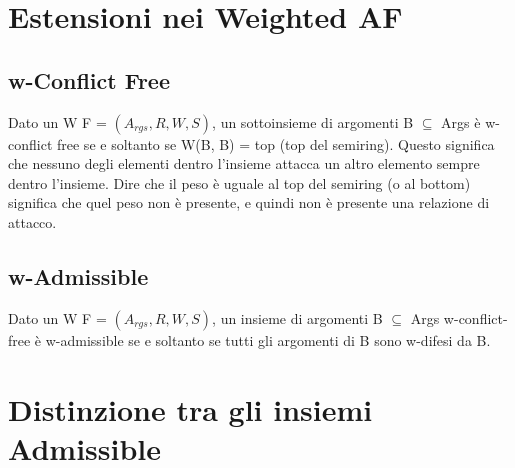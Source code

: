     \section{Estensioni nei Weighted AF}
    \subsection{w-Conflict Free}
    Dato un W F = $(A_{rgs} , R, W, S)$, un sottoinsieme di argomenti B
$\subseteq$ Args è w-conflict free se e soltanto se W(B, B) = top (top del
    semiring). Questo significa che nessuno degli elementi dentro l'insieme
    attacca un altro elemento sempre dentro l'insieme. Dire che il peso è uguale
    al top del semiring (o al bottom) significa che quel peso non è presente, e
    quindi non è presente una relazione di attacco.
    \subsection{w-Admissible}
    Dato un W F = $(A_{rgs} , R, W, S)$, un insieme di argomenti B $\subseteq$
    Args w-conflict-free è w-admissible se e soltanto se tutti gli argomenti di
    B sono w-difesi da B.
    \section{Distinzione tra gli insiemi Admissible}
